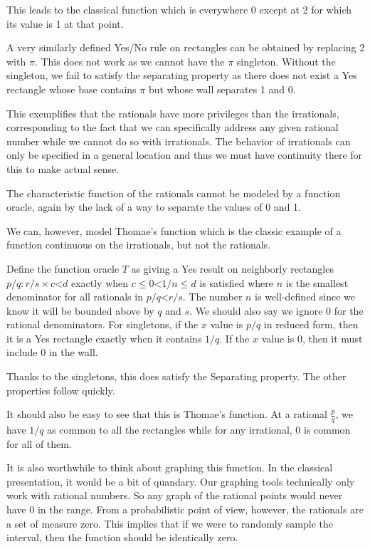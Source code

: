 \documentclass[12pt]{article}
\theoremstyle{remark}
\newcommand{\lt}{\mathord{<}}
\begin{document}
This leads to the classical function which is everywhere 0 except at 2 for which its value is 1 at that point. 

A very similarly defined Yes/No rule on rectangles can be obtained by replacing 2 with $\pi$. This does not work as we cannot have the $\pi$ singleton. Without the singleton, we fail to satisfy the separating property as there does not exist a Yes rectangle whose base contains $\pi$ but whose wall separates 1 and 0.  

This exemplifies that the rationals have more privileges than the irrationals, corresponding to the fact that we can specifically address any given rational number while we cannot do so with irrationals. The behavior of irrationals can only be specified in a general location and thus we must have continuity there for this to make actual sense. 

The characteristic function of the rationals cannot be modeled by a function oracle, again by the lack of a way to separate the values of 0 and 1. 

We can, however, model Thomae's function which is the classic example of a function continuous on the irrationals, but not the rationals. 

Define the function oracle $T$ as giving a Yes result on neighborly rectangles $p/q : r/s \times c\lt d$ exactly when $c \leq 0 \lt 1/n \leq d$ is satisfied where $n$ is the smallest denominator for all rationals in $p/q \lt r/s$. The number $n$ is well-defined since we know it will be bounded above by $q$ and $s$.  We should also say we ignore $0$ for the rational denominators. For singletons, if the $x$ value is $p/q$ in reduced form, then it is a Yes rectangle exactly when it contains $1/q$. If the $x$ value is $0$, then it must include $0$ in the wall.

Thanks to the singletons, this does satisfy the Separating property. The other properties follow quickly. 

It should also be easy to see that this is Thomae's function. At a rational $\frac{p}{q}$, we have $1/q$ as common to all the rectangles while for any irrational, $0$ is common for all of them. 

It is also worthwhile to think about graphing this function. In the classical presentation, it would be a bit of quandary. Our graphing tools technically only work with rational numbers. So any graph of the rational points would never have 0 in the range. From a probabilistic point of view, however, the rationals are a set of measure zero. This implies that if we were to randomly sample the interval, then the function should be identically zero. 
\end{document}
